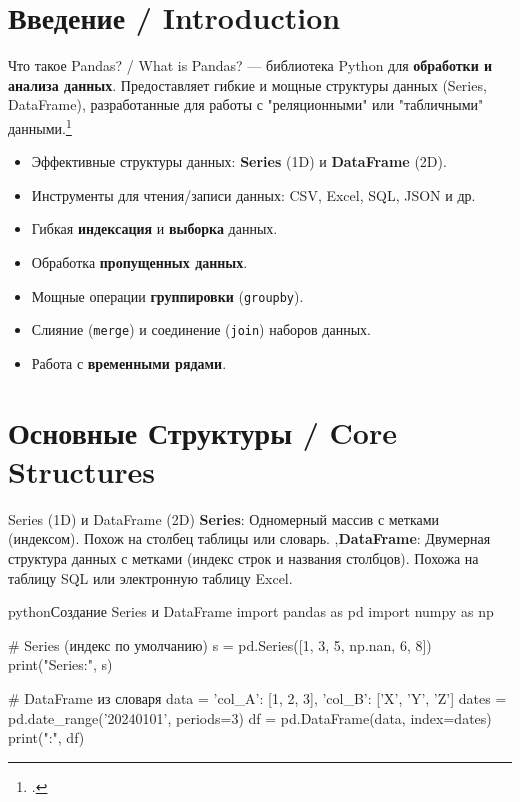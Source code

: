 \section{Введение / Introduction}

\begin{textbox}{Что такое Pandas? / What is Pandas?}
 — библиотека Python для \textbf{обработки и анализа данных}. Предоставляет гибкие и мощные структуры данных (Series, DataFrame), разработанные для работы с "реляционными" или "табличными" данными.\footcite[Гл. 5]{mckinney2017python}

\bigskip
{}
\begin{itemize}
    \item Эффективные структуры данных: \textbf{Series} (1D) и \textbf{DataFrame} (2D).
    \item Инструменты для чтения/записи данных: CSV, Excel, SQL, JSON и др.
    \item Гибкая \textbf{индексация} и \textbf{выборка} данных.
    \item Обработка \textbf{пропущенных данных}.
    \item Мощные операции \textbf{группировки} (\texttt{groupby}).
    \item Слияние (\texttt{merge}) и соединение (\texttt{join}) наборов данных.
    \item Работа с \textbf{временными рядами}.
\end{itemize}
\end{textbox}

\section{Основные Структуры / Core Structures}

\begin{textbox}{Series (1D) и DataFrame (2D)}
\textbf{Series}: Одномерный массив с метками (индексом). Похож на столбец таблицы или словарь. \sep \textbf{DataFrame}: Двумерная структура данных с метками (индекс строк и названия столбцов). Похожа на таблицу SQL или электронную таблицу Excel.

\begin{codebox}{python}{Создание Series и DataFrame}
import pandas as pd
import numpy as np

# Series (индекс по умолчанию)
s = pd.Series([1, 3, 5, np.nan, 6, 8])
print("Series:\n", s)

# DataFrame из словаря
data = {'col_A': [1, 2, 3], 'col_B': ['X', 'Y', 'Z']}
dates = pd.date_range('20240101', periods=3)
df = pd.DataFrame(data, index=dates)
print("\nDataFrame:\n", df)
\end{codebox}
\end{textbox}

